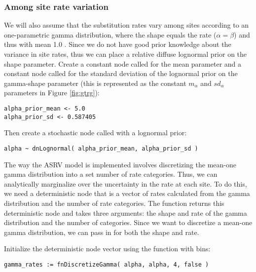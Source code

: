 \subsubsection{Among site rate variation}

We will also assume that the substitution rates vary among sites according to an one-parametric gamma distribution, \IE where the shape equals the rate ($\alpha=\beta$) and thus with mean 1.0 \citep{Yang1994a}. 
Since we do not have good prior knowledge about the variance in site rates, thus we can place a relative diffuse lognormal prior on the shape parameter.
Create a constant node called  for the mean parameter and a constant node called  for the standard deviation of the lognormal prior on the gamma-shape parameter (this is represented as the constant $m_\alpha$ and $sd_\alpha$ parameters in Figure \ref{fig:gtrg}):
{\tt\begin{snugshade*}
\begin{lstlisting}
alpha_prior_mean <- 5.0
alpha_prior_sd <- 0.587405
\end{lstlisting}
\end{snugshade*}}

Then create a stochastic node called  with a lognormal prior:
{\tt\begin{snugshade*}
\begin{lstlisting}
alpha ~ dnLognormal( alpha_prior_mean, alpha_prior_sd )
\end{lstlisting}
\end{snugshade*}}

The way the ASRV model is implemented involves discretizing the mean-one gamma distribution into a set number of rate categories. 
Thus, we can analytically marginalize over the uncertainty in the rate at each site. 
To do this, we need a deterministic node that is a vector of rates calculated from the gamma distribution and the number of rate categories. 
The  function returns this deterministic node and takes three arguments: the shape and rate of the gamma distribution and the number of categories. 
Since we want to discretize a mean-one gamma distribution, we can pass in  for both the shape and rate.

Initialize the  deterministic node vector using the   function with  bins:
{\tt \begin{snugshade*}
\begin{lstlisting}
gamma_rates := fnDiscretizeGamma( alpha, alpha, 4, false )
\end{lstlisting}
\end{snugshade*}}

